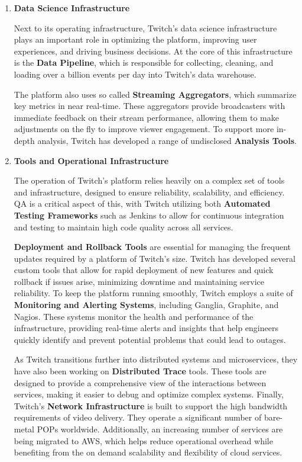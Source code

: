 \begin{enumerate}
    \item \textbf{Data Science Infrastructure}

    Next to its operating infrastructure, Twitch’s data science infrastructure plays an important role in optimizing the platform, improving user experiences, and driving business decisions. At the core of this infrastructure is the \textbf{Data Pipeline}, which is responsible for collecting, cleaning, and loading over a billion events per day into Twitch’s data warehouse. 

    The platform also uses so called \textbf{Streaming Aggregators}, which summarize key metrics in near real-time. These aggregators provide broadcasters with immediate feedback on their stream performance, allowing them to make adjustments on the fly to improve viewer engagement. To support more in-depth analysis, Twitch has developed a range of undisclosed \textbf{Analysis Tools}.

    \item \textbf{Tools and Operational Infrastructure}

    The operation of Twitch’s platform relies heavily on a complex set of tools and infrastructure, designed to ensure reliability, scalability, and efficiency. \ac{QA} is a critical aspect of this, with Twitch utilizing both \textbf{Automated Testing Frameworks} such as Jenkins to allow for continuous integration and testing to maintain high code quality across all services.

    \textbf{Deployment and Rollback Tools} are essential for managing the frequent updates required by a platform of Twitch’s size. Twitch has developed several custom tools that allow for rapid deployment of new features and quick rollback if issues arise, minimizing downtime and maintaining service reliability. To keep the platform running smoothly, Twitch employs a suite of \textbf{Monitoring and Alerting Systems}, including Ganglia, Graphite, and Nagios. These systems monitor the health and performance of the infrastructure, providing real-time alerts and insights that help engineers quickly identify and prevent potential problems that could lead to outages.

    As Twitch transitions further into distributed systems and microservices, they have also been working on \textbf{Distributed Trace} tools. These tools are designed to provide a comprehensive view of the interactions between services, making it easier to debug and optimize complex systems. Finally, Twitch’s \textbf{Network Infrastructure} is built to support the high bandwidth requirements of video delivery. They operate a significant number of bare-metal \ac{POPs} worldwide. Additionally, an increasing number of services are being migrated to \ac{AWS}, which helps reduce operational overhead while benefiting from the on demand scalability and flexibility of cloud services.

\end{enumerate}

